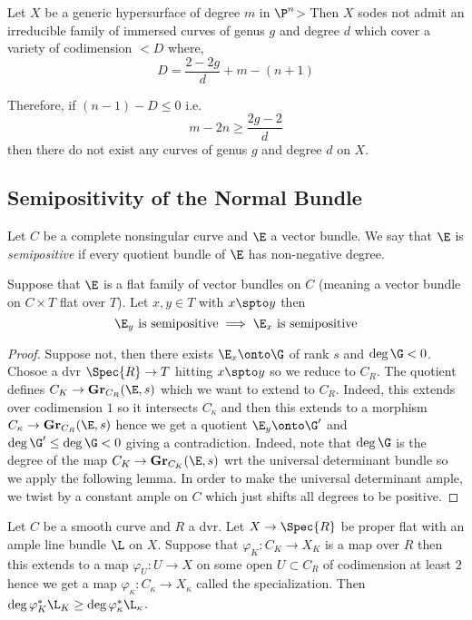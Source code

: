 \documentclass[12pt]{article}
\begin{document}
\begin{theorem}
Let $X$ be a generic hypersurface of degree $m$ in $\P^n$> Then $X$ sodes not admit an irreducible family of immersed curves of genus $g$ and degree $d$ which cover a variety of codimension $< D$ where,
\[ D = \frac{2 - 2 g}{d} + m - (n+1) \]
\end{theorem}

\begin{cor}
Therefore, if $(n-1) - D \le 0$ i.e.
\[ m - 2 n \ge \frac{2g - 2}{d} \]
then there do not exist any curves of genus $g$ and degree $d$ on $X$.
\end{cor}

\subsection{Semipositivity of the Normal Bundle}

\newcommand{\Gr}{\mathbf{Gr}}

\begin{defn}
Let $C$ be a complete nonsingular curve and $\E$ a vector bundle. We say that $\E$ is \textit{semipositive} if every quotient bundle of $\E$ has non-negative degree.
\end{defn}

\begin{lemma}
Suppose that $\E$ is a flat family of vector bundles on $C$ (meaning a vector bundle on $C \times T$ flat over $T$). Let $x, y \in T$ with $x \spto y$ then
\[ \E_y \text{ is semipositive} \implies \E_x \text{ is semipositive} \]
\end{lemma}

\begin{proof}
Suppose not, then there exists $\E_x \onto \G$ of rank $s$ and $\deg{\G} < 0$. Chosoe a dvr $\Spec{R} \to T$ hitting $x \spto y$ so we reduce to $C_R$. The quotient defines $C_K \to \Gr_{C_R}(\E, s)$ which we want to extend to $C_R$. Indeed, this extends over codimension $1$ so it intersects $C_\kappa$ and then this extends to a morphism $C_\kappa \to \Gr_{C_R}(\E, s)$ hence we get a quotient $\E_y \onto \G'$ and $\deg{\G'} \le \deg{\G} < 0$ giving a contradiction. Indeed, note that $\deg{\G}$ is the degree of the map $C_K \to \Gr_{C_K}(\E, s)$ wrt the universal determinant bundle so we apply the following lemma. In order to make the universal determinant ample, we twist by a constant ample on $C$ which just shifts all degrees to be positive.
\end{proof}

\begin{lemma}
Let $C$ be a smooth curve and $R$ a dvr. Let $X \to \Spec{R}$ be proper flat with an ample line bundle $\L$ on $X$. Suppose that $\varphi_K : C_K \to X_K$ is a map over $R$ then this extends to a map $\varphi_U  : U \to X$ on some open $U \subset C_R$ of codimension at least $2$ hence we get a map $\varphi_\kappa : C_\kappa \to X_\kappa$ called the specialization. Then $\deg{\varphi_K^* \L_K} \ge \deg{\varphi_\kappa^* \L_\kappa}$.
\end{lemma}
\end{document}
